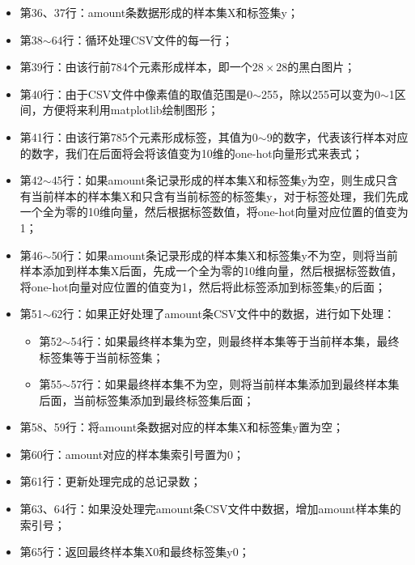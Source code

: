 \documentclass[UTF8]{article}
\begin{document}
\begin{itemize}
\item 第36、37行：amount条数据形成的样本集X和标签集y；
\item 第38$\sim$64行：循环处理CSV文件的每一行；
\item 第39行：由该行前784个元素形成样本，即一个$28 \times 28$的黑白图片；
\item 第40行：由于CSV文件中像素值的取值范围是0$\sim$255，除以255可以变为0$\sim$1区间，方便将来利用matplotlib绘制图形；
\item 第41行：由该行第785个元素形成标签，其值为0$\sim$9的数字，代表该行样本对应的数字，我们在后面将会将该值变为10维的one-hot向量形式来表式；
\item 第42$\sim$45行：如果amount条记录形成的样本集X和标签集y为空，则生成只含有当前样本的样本集X和只含有当前标签的标签集y，对于标签处理，我们先成一个全为零的10维向量，然后根据标签数值，将one-hot向量对应位置的值变为1；
\item 第46$\sim$50行：如果amount条记录形成的样本集X和标签集y不为空，则将当前样本添加到样本集X后面，先成一个全为零的10维向量，然后根据标签数值，将one-hot向量对应位置的值变为1，然后将此标签添加到标签集y的后面；
\item 第51$\sim$62行：如果正好处理了amount条CSV文件中的数据，进行如下处理：
	\begin{itemize}
	\item 第52$\sim$54行：如果最终样本集为空，则最终样本集等于当前样本集，最终标签集等于当前标签集；
	\item 第55$\sim$57行：如果最终样本集不为空，则将当前样本集添加到最终样本集后面，当前标签集添加到最终标签集后面；
	\end{itemize}
\item 第58、59行：将amount条数据对应的样本集X和标签集y置为空；
\item 第60行：amount对应的样本集索引号置为0；
\item 第61行：更新处理完成的总记录数；
\item 第63、64行：如果没处理完amount条CSV文件中数据，增加amount样本集的索引号；
\item 第65行：返回最终样本集X0和最终标签集y0；
\end{itemize}
\end{document}
